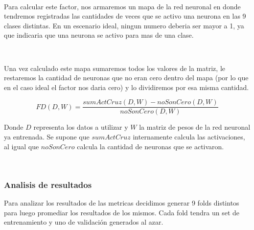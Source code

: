 \documentclass[informe.tex]{subfiles}
\begin{document}
      ~
      
      Para calcular este factor, nos armaremos un mapa de la red neuronal en donde tendremos registradas las cantidades de veces que se activo una neurona en las 9 clases distintas. En un escenario ideal, ningun numero deberia ser mayor a 1, ya que indicaria que una neurona se activo para mas de una clase.
      
      ~
      
      Una vez calculado este mapa sumaremos todos los valores de la matriz, le restaremos la cantidad de neuronas que no eran cero dentro del mapa (por lo que en el caso ideal el factor nos daria cero) y lo dividiremos por esa misma cantidad.
      
      $$FD(D, W) = \frac{sumActCruz(D, W) - noSonCero(D, W)}{noSonCero(D, W)}$$
      
      Donde $D$ representa los datos a utilizar y $W$ la matriz de pesos de la red neuronal ya entrenada. Se supone que $sumActCruz$ internamente calcula las activaciones, al igual que $noSonCero$ calcula la cantidad de neuronas que se activaron.
      
      ~
      \subsubsection{Analisis de resultados}
      Para analizar los resultados de las metricas decidimos generar 9 folds distintos para luego promediar los resultados de los mismos. Cada fold tendra un set de entrenamiento y uno de validación generados al azar.
    
      
      
\end{document}
